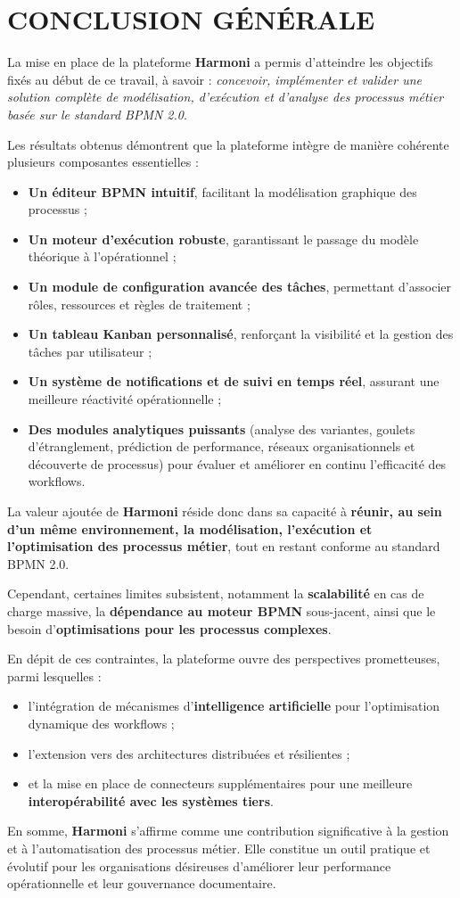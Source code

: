 \chapter*{CONCLUSION GÉNÉRALE}
\label{ch:conclusion}


La mise en place de la plateforme \textbf{Harmoni} a permis d’atteindre les objectifs fixés au début de ce travail, à savoir : \textit{concevoir, implémenter et valider une solution complète de modélisation, d’exécution et d’analyse des processus métier basée sur le standard BPMN 2.0}.  

Les résultats obtenus démontrent que la plateforme intègre de manière cohérente plusieurs composantes essentielles :  
\begin{itemize}
    \item \textbf{Un éditeur BPMN intuitif}, facilitant la modélisation graphique des processus ;  
    \item \textbf{Un moteur d’exécution robuste}, garantissant le passage du modèle théorique à l’opérationnel ;  
    \item \textbf{Un module de configuration avancée des tâches}, permettant d’associer rôles, ressources et règles de traitement ;  
    \item \textbf{Un tableau Kanban personnalisé}, renforçant la visibilité et la gestion des tâches par utilisateur ;  
    \item \textbf{Un système de notifications et de suivi en temps réel}, assurant une meilleure réactivité opérationnelle ;  
    \item \textbf{Des modules analytiques puissants} (analyse des variantes, goulets d’étranglement, prédiction de performance, réseaux organisationnels et découverte de processus) pour évaluer et améliorer en continu l’efficacité des workflows.  
\end{itemize}

La valeur ajoutée de \textbf{Harmoni} réside donc dans sa capacité à \textbf{réunir, au sein d’un même environnement, la modélisation, l’exécution et l’optimisation des processus métier}, tout en restant conforme au standard BPMN 2.0.  

Cependant, certaines limites subsistent, notamment la \textbf{scalabilité} en cas de charge massive, la \textbf{dépendance au moteur BPMN} sous-jacent, ainsi que le besoin d’\textbf{optimisations pour les processus complexes}.  

En dépit de ces contraintes, la plateforme ouvre des perspectives prometteuses, parmi lesquelles :  
\begin{itemize}
    \item l’intégration de mécanismes d’\textbf{intelligence artificielle} pour l’optimisation dynamique des workflows ;  
    \item l’extension vers des architectures distribuées et résilientes ;  
    \item et la mise en place de connecteurs supplémentaires pour une meilleure \textbf{interopérabilité avec les systèmes tiers}.  
\end{itemize}

En somme, \textbf{Harmoni} s’affirme comme une contribution significative à la gestion et à l’automatisation des processus métier. Elle constitue un outil pratique et évolutif pour les organisations désireuses d’améliorer leur performance opérationnelle et leur gouvernance documentaire.  
